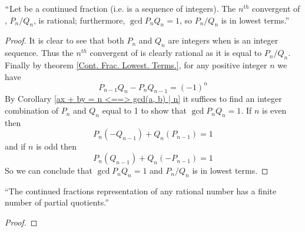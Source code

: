         \begin{corollary}
            $``$Let  be a continued fraction (i.e.
             is a sequence of integers). The $n^{th}$
            convergent of , $P_n / Q_n$, is rational;
            furthermore, $\gcd{P_n}{Q_n} = 1$, so $P_n / Q_n$ is in lowest
            terms.''
        \end{corollary}
        \begin{proof}
            It is clear to see that both $P_n$ and $Q_n$ are integers when
             is an integer sequence. Thus the $n^{th}$
            convergent of  is clearly rational as it is equal
            to $P_n / Q_n$. Finally by theorem \ref{Cont. Frac. Lowest. Terms.},
            for any positive integer $n$ we have
            \begin{equation}
                \label{Cont. Frac. GCD Eq 1}
                P_{n - 1} Q_n - P_n Q_{n - 1} = (-1)^n
            \end{equation}
            By Corollary \ref{ax + by = n <==> gcd(a, b) | n} it suffices to find
            an integer combination of $P_n$ and $Q_n$ equal to 1 to show that
            $\gcd{P_n}{Q_n} = 1$. If $n$ is even then
            \begin{equation}
                P_n (-Q_{n - 1}) + Q_n (P_{n - 1}) = 1
            \end{equation}
            and if $n$ is odd then
            \begin{equation}
                P_{n} (Q_{n - 1}) + Q_n(-P_{n - 1}) = 1
            \end{equation}
            So we can conclude that $\gcd{P_n}{Q_n} = 1$ and $P_n / Q_n$ is in
            lowest terms. \QED
        \end{proof}
        \begin{theorem}
            ``The continued fractions representation of any rational number has a finite number
              of partial quotients.''
        \end{theorem}
        \begin{proof}
        \end{proof}
